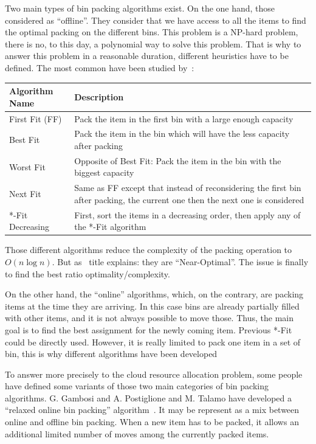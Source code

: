 Two main types of bin packing algorithms exist. On the one hand, those
considered as “offline”. They consider that we have access to all the items to
find the optimal packing on the different bins. This problem is a NP-hard
problem, there is no, to this day, a polynomial way to solve this problem.
That is why to answer this problem in a reasonable duration, different
heuristics have to be defined. The most common have been studied
by~\cite*{mathsBpheuristics}:

\vspace{1em}
\begin{center}
	\begin{tabular}{| l | p{7cm} |}
		\hline
		Algorithm Name & Description \\
		\hline
		First Fit (FF) & Pack the item in the first bin with a large enough capacity \\
		\hline
		Best Fit & Pack the item in the bin which will have the less capacity after packing \\
		\hline
		Worst Fit & Opposite of Best Fit: Pack the item in the bin with the biggest capacity \\
		\hline
		Next Fit & Same as FF except that instead of reconsidering the first bin after packing, the current one then the next one is considered \\
		\hline
		*-Fit Decreasing & First, sort the items in a decreasing order, then apply any of the *-Fit algorithm \\
		\hline
	\end{tabular}
\end{center}
\vspace{1em}

Those different algorithms reduce the complexity of the packing operation to
$O(n\log{n})$. But as~\cite{mathsBpheuristics} title explains: they are
“Near-Optimal”. The issue is finally to find the best ratio optimality/complexity.

On the other hand, the “online” algorithms, which, on the contrary, are packing
items at the time they are arriving. In this case bins are already partially
filled with other items, and it is not always possible to move those. Thus, the
main goal is to find the best assignment for the newly coming item. Previous
*-Fit could be directly used. However, it is really limited to pack one item in
a set of bin, this is why different algorithms have been developed

To answer more precisely to the cloud resource allocation problem, some people
have defined some variants of those two main categories of bin packing
algorithms. G. Gambosi and A. Postiglione and M. Talamo have developed a
“relaxed online bin packing” algorithm~\cite*{mathsRelaxedonlinebp}. It may be
represent as a mix between online and offline bin packing. When a new item has
to be packed, it allows an additional limited number of moves among the
currently packed items.

